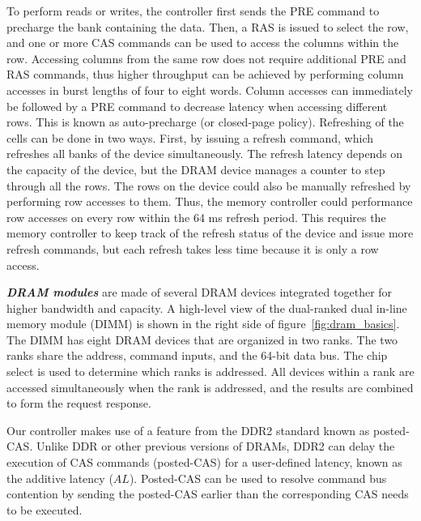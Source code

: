To perform reads or writes, the controller first sends the PRE command to precharge the bank containing the data. 
Then, a RAS is issued to select the row, and one or more CAS commands can be used to access the columns within the row. 
Accessing columns from the same row does not require additional PRE and RAS commands, thus higher throughput can be achieved by performing column accesses in burst lengths of four to eight words.  
Column accesses can immediately be followed by a PRE command to decrease latency when accessing different rows. 
This is known as auto-precharge (or closed-page policy).
Refreshing of the cells can be done in two ways.
First, by issuing a refresh command, which refreshes all banks of the device simultaneously. 
The refresh latency depends on the capacity of the device, but the DRAM device manages a counter to step through all the rows.
The rows on the device could also be manually refreshed by performing row accesses to them.
Thus, the memory controller could performance row accesses on every row within the 64 ms refresh period.
This requires the memory controller to keep track of the refresh status of the device and issue more refresh commands, but each refresh takes less time because it is only a row access. 

\textbf{\emph{DRAM modules}} are made of several DRAM devices integrated together for higher bandwidth and capacity. 
A high-level view of the dual-ranked dual in-line memory module (DIMM) is shown in the right side of figure~\ref{fig:dram_basics}.
The DIMM has eight DRAM devices that are organized in two ranks.
The two ranks share the address, command inputs, and the 64-bit data bus.
The chip select is used to determine which ranks is addressed.
All devices within a rank are accessed simultaneously when the rank is addressed, and the results are combined to form the request response.  

Our controller makes use of a feature from the DDR2 standard known as posted-CAS.  
Unlike DDR or other previous versions of DRAMs, DDR2 can delay the execution of CAS commands (posted-CAS) for a user-defined latency, known as the additive latency ($AL$). 
Posted-CAS can be used to resolve command bus contention by sending the posted-CAS earlier than the corresponding CAS needs to be executed.

